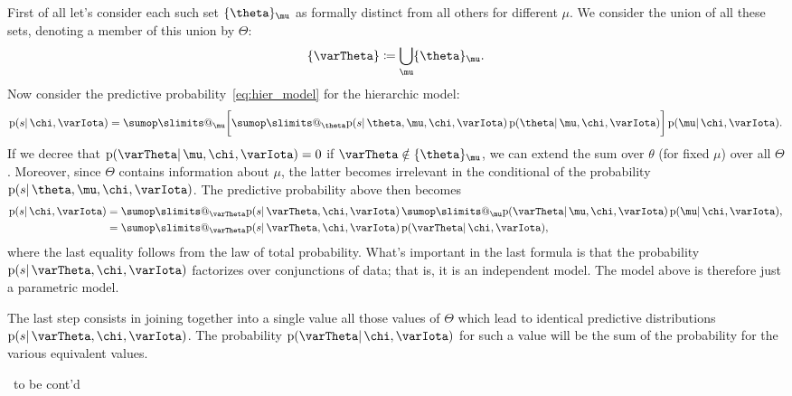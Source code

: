 \documentclass[\ifafour a4paper,12pt,\else a5paper,10pt,\fi%
onecolumn,oneside,article,%
british%
]{memoir}
\makeatletter
\theoremstyle{remark}
\theoremstyle{innote}
\def\sum{\DOTSI\sumop\slimits@}
\newcommand*{\defd}{\coloneqq}
\DeclarePairedDelimiter\set{\{}{\}}
\newcommand*{\pf}{\mathrm{p}}%
\renewcommand*{\|}{\mathpunct{|}}
\newcommand*{\puzzle}{\maltese}
\newcommand{\mynote}[1]{ {\color{notecolour}\puzzle\ #1\ }}
\newcommand*{\yI}{\varIota}
\newcommand*{\yth}{\theta}
\newcommand*{\yTh}{\varTheta}
\newcommand*{\ymu}{\mu}
\newcommand*{\yh}{\chi}
\makeatother
\begin{document}
First of all let's consider each such set $\set{\yth}_{\ymu}$ as formally
distinct from all others for different $\ymu$. We consider the union of all
these sets, denoting a member of this union by $\yTh$:
\begin{equation}
  \label{eq:union_indip_models}
  \set{\yTh} \defd \bigcup_{\ymu}\set{\yth}_{\ymu}.
\end{equation}
Now consider the predictive probability~\eqref{eq:hier_model} for the
hierarchic model:
\begin{equation}
  \label{eq:hier_model_simple}
  \pf(s \| \yh, \yI) =
\sum_\ymu\biggl[ \sum_{\yth}
\pf(s \|\yth,\ymu,\yh,\yI)\,
     \pf(\yth \| \ymu,\yh, \yI)\biggr]\,
     \pf(\ymu \| \yh,\yI).
\end{equation}
If we decree that $\pf(\yTh \| \ymu,\yh,\yI) = 0$ if $\yTh \notin
\set{\yth}_{\ymu}$, we can extend the sum over $\yth$ (for fixed $\ymu$)
over all $\yTh$. Moreover, since $\yTh$ contains information about $\ymu$,
the latter becomes irrelevant in the conditional of the probability $\pf(s
\|\yth,\ymu,\yh,\yI)$. The predictive probability above then becomes
\begin{equation}
  \label{eq:hier_model_Theta}
  \begin{split}
  \pf(s \| \yh, \yI) &=
\sum_{\yTh}
\pf(s \|\yTh,\yh,\yI)\, \sum_\ymu 
     \pf(\yTh \| \ymu,\yh, \yI)\,
     \pf(\ymu \| \yh,\yI),
\\ &= \sum_{\yTh}
\pf(s \|\yTh,\yh,\yI)\,
     \pf(\yTh \| \yh, \yI),
   \end{split}
\end{equation}
where the last equality follows from the law of total probability. What's
important in the last formula is that the probability
$\pf(s \|\yTh,\yh,\yI)$ factorizes over conjunctions of data; that is, it
is an independent model. The model above is therefore just a parametric
model.

The last step consists in joining together into a single value all those
values of $\yTh$ which lead to identical predictive distributions
$\pf(s \|\yTh,\yh,\yI)$. The probability $\pf(\yTh \| \yh, \yI)$  for such
a value will be the sum of the probability for the various equivalent values.

\mynote{to be cont'd}



\end{document}
